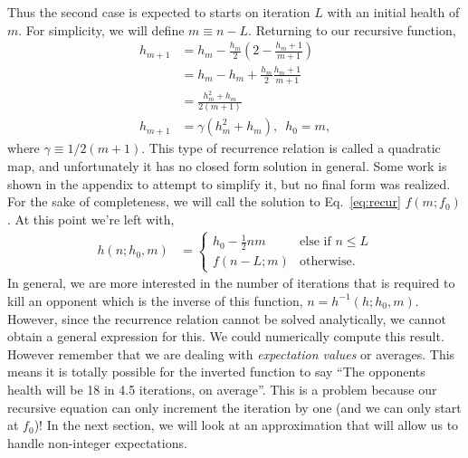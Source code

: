 \documentclass[../../main.tex]{subfiles}
\begin{document}
			Thus the second case is expected to starts on iteration $L$ with an initial health of $m$. For simplicity, we will define $m\equiv n-L$. Returning to our recursive function,
			\begin{align}
				h_{m+1} &= h_{m} - \frac{h_m}{2}\left(2 - \frac{h_m + 1}{m+1}\right) \\
				&= h_{m} - h_m + \frac{h_m}{2}\frac{h_m + 1}{m+1} \\
				&= \frac{h_m^2 + h_m}{2(m+1)} \\
				h_{m+1} &= \gamma (h_m^2 + h_m),\,\,\,h_0 = m, \label{eq:recur}
			\end{align}
			where $\gamma\equiv1 / 2(m+1)$. This type of recurrence relation is called a quadratic map, and unfortunately it has no closed form solution in general. Some work is shown in the appendix to attempt to simplify it, but no final form was realized. For the sake of completeness, we will call the solution to Eq.~\ref{eq:recur} $f(m; f_0)$. At this point we're left with,
			\begin{align}
					h(n; h_0, m) &=  \begin{cases}
					h_0 - \frac{1}{2}nm &\text{else if $n \le L$} \\
					f(n - L; m) &\text{otherwise}.
				\end{cases}
			\end{align}
			In general, we are more interested in the number of iterations that is required to kill an opponent which is the inverse of this function, $n=h^{-1}(h; h_0, m)$. However, since the recurrence relation cannot be solved analytically, we cannot obtain a general expression for this. We could numerically compute this result. However remember that we are dealing with \emph{expectation values} or averages. This means it is totally possible for the inverted function to say ``The opponents health will be 18 in 4.5 iterations, on average''. This is a problem because our recursive equation can only increment the iteration by one (and we can only start at $f_0$)! In the next section, we will look at an approximation that will allow us to handle non-integer expectations.
\end{document}
